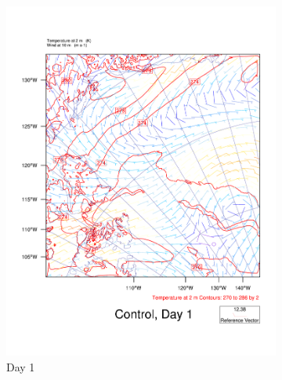 \begin{figure}
    \centering
    \begin{subfigure}{0.48\textwidth}
        \centering
        \includegraphics[width=\textwidth]{results/T2UV10_Control_Day1.pdf}
        \caption{Day 1}
        \label{subfig:weather_cont_day1}
    \end{subfigure}
    \begin{subfigure}{0.48\textwidth}
        \centering

\end{subfigure}
\end{figure}
